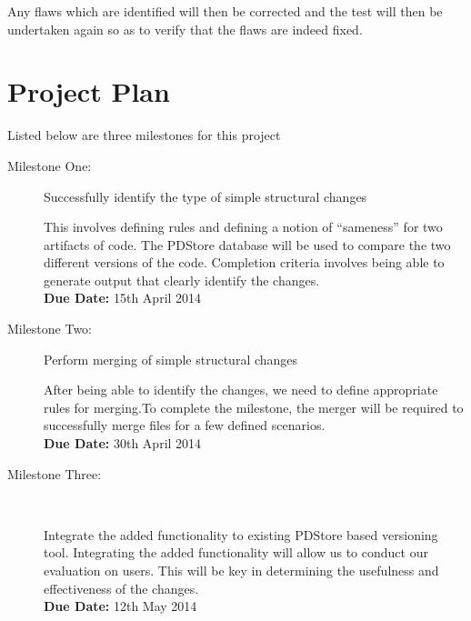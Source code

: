\documentclass[11pt,twocolumn]{article}
\begin{document}
Any flaws which are identified will then be corrected and the test
will then be undertaken again so as to verify that the flaws are indeed
fixed.


\section{Project Plan}

Listed below are three milestones for this project %

\begin{description}
\item [{Milestone One:}] Successfully identify the type of simple structural
changes


This involves defining rules and defining a notion of “sameness” for
two artifacts of code. The PDStore database will be used to compare
the two different versions of the code. Completion criteria involves
being able to generate output that clearly identify the changes. \\
\textbf{Due Date:} 15th April 2014

\item [{Milestone Two:}] Perform merging of simple structural changes


After being able to identify the changes, we need to define appropriate
rules for merging.To complete the milestone, the merger will be required
to successfully merge files for a few defined scenarios. \\
\textbf{Due Date:} 30th April 2014

\item [{Milestone Three:}]~


Integrate the added functionality to existing PDStore based versioning
tool. Integrating the added functionality will allow us to conduct
our evaluation on users. This will be key in determining the usefulness
and effectiveness of the changes.\\
\textbf{Due Date:} 12th May 2014 

\end{description}


\end{document}
